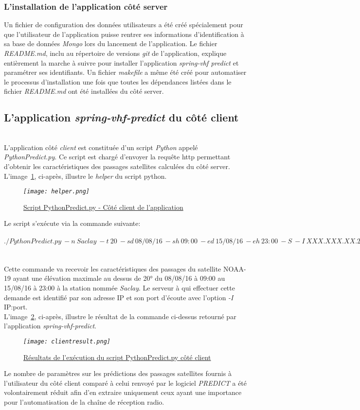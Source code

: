\documentclass[12pt,fleqn]{book} %
\begin{document}
\subsubsection{L'installation de l'application côté server}
\noindent Un fichier de configuration des données utilisateurs a été créé spécialement pour que l'utilisateur de l'application puisse rentrer ses informations d'identification à sa base de données \emph{Mongo} lors du lancement de l'application. Le fichier \emph{README.md}, inclu au répertoire de versions \emph{git} de l'application, explique entièrement la marche à suivre pour installer l'application \emph{spring-vhf predict} et paramétrer ses identifiants. Un fichier \emph{makefile} a même été créé pour automatiser le processus d'installation une fois que toutes les dépendances listées dans le fichier \emph{README.md} ont été installées du côté server.
\subsection{L'application \emph{spring-vhf-predict} du côté client}
~\\\indent L'application côté \emph{client} est constituée d'un script \emph{Python} appelé \emph{PythonPredict.py}. Ce script est chargé d'envoyer la requête http permettant d'obtenir les caractéristiques des passages satellites calculées du côté server.
~\\L'image~\underline{\color{blue}\ref{helper}}, ci-après, illustre le \emph{helper} du script python.
\begin{figure}[H]
	\centering
	\itshape
	\texttt{[image: helper.png]}
	\caption{\label{helper} \underline{Script PythonPredict.py - Côté client de l'application}}
\end{figure}
\noindent Le script s'exécute via la commande suivante:
~\\\\$ ./PythonPredict.py\ -n\ Saclay\ -t\ 20\ -sd\ 08/08/16\ -sh\ 09:00\ -ed\ 15/08/16\ -eh\ 23:00\ -S\ -I\ XXX.XXX.XX.200:8000 $
~\\\\Cette commande va recevoir les caractéristiques des passages du satellite NOAA-19 ayant une élévation maximale au dessus de 20° du 08/08/16 à 09:00 au 15/08/16 à 23:00 à la station nommée \emph{Saclay}. Le serveur à qui effectuer cette demande est identifié par son adresse IP et son port d'écoute avec l'option \emph{-I} IP:port. 
~\\L'image~\underline{\color{blue}\ref{clientresult}}, ci-après, illustre le résultat de la commande ci-dessus retourné par l'application \emph{spring-vhf-predict}.
\begin{figure}[H]
	\centering
	\itshape
	\texttt{[image: clientresult.png]}
	\caption{\label{clientresult} \underline{Résultats de l'exécution du script PythonPredict.py côté client}}
\end{figure}
\noindent Le nombre de paramètres sur les prédictions des passages satellites fournis à l'utilisateur du côté client comparé à celui renvoyé par le logiciel \emph{PREDICT} a été volontairement réduit afin d'en extraire uniquement ceux ayant une importance pour l'automatisation de la chaîne de réception radio. 
\end{document}
